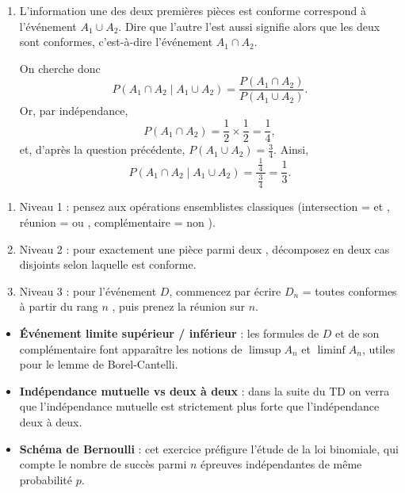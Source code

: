 \begin{Corrige}
\begin{enumerate}
    \item L'information \og une des deux premières pièces est conforme \fg{} correspond à l'événement $A_1 \cup A_2$. Dire que l'autre l'est aussi signifie alors que les deux sont conformes, c'est-à-dire l'événement $A_1 \cap A_2$.

    On cherche donc
    $$
    P(A_1 \cap A_2 \mid A_1 \cup A_2) = \frac{P(A_1 \cap A_2)}{P(A_1 \cup A_2)}.
    $$
    Or, par indépendance,
    $$
    P(A_1 \cap A_2) = \frac{1}{2} \times \frac{1}{2} = \frac{1}{4},
    $$
    et, d'après la question précédente, $P(A_1 \cup A_2) = \frac{3}{4}$. Ainsi,
    $$
    P(A_1 \cap A_2 \mid A_1 \cup A_2) = \frac{\,\frac{1}{4}\,}{\,\frac{3}{4}\,} = \frac{1}{3}.
    $$
\end{enumerate}
\end{Corrige}


\begin{Indices}
\begin{enumerate}
  \item Niveau 1 : pensez aux opérations ensemblistes classiques (intersection = \og et \fg, réunion = \og ou \fg, complémentaire = \og non \fg).
  \item Niveau 2 : pour \og exactement une pièce parmi deux \fg, décomposez en deux cas disjoints selon laquelle est conforme.
  \item Niveau 3 : pour l'événement $D$, commencez par écrire $D_n$ = \og toutes conformes à partir du rang $n$ \fg, puis prenez la réunion sur $n$.
\end{enumerate}
\end{Indices}

\begin{PlusLoin}
\begin{itemize}
  \item \textbf{Événement limite supérieur / inférieur} : les formules de $D$ et de son complémentaire font apparaître les notions de $\limsup A_n$ et $\liminf A_n$, utiles pour le lemme de Borel-Cantelli.
  \item \textbf{Indépendance mutuelle vs deux à deux} : dans la suite du TD on verra que l'indépendance mutuelle est strictement plus forte que l'indépendance deux à deux.
  \item \textbf{Schéma de Bernoulli} : cet exercice préfigure l'étude de la loi binomiale, qui compte le nombre de succès parmi $n$ épreuves indépendantes de même probabilité $p$.
\end{itemize}
\end{PlusLoin}
